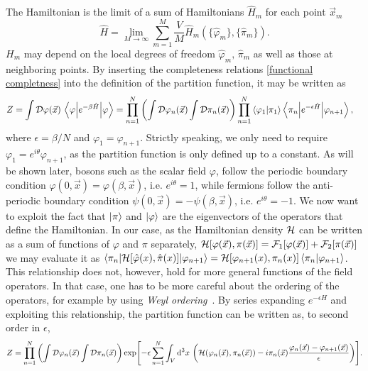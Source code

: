 The Hamiltonian is the limit of a sum of Hamiltonians $\hat H_m$ for each point $\vec x_m$
\begin{equation*}
    \hat H
    = \lim_{M \rightarrow \infty} \sum_{m=1}^M 
    \frac{V}{M} \hat H_m(\{\hat \varphi_m\}, \{\hat \pi_m\}).
\end{equation*}
$H_m$ may depend on the local degrees of freedom $\hat \varphi_m, \, \hat \pi_m$ as well as those at neighboring points.
By inserting the completeness relations \autoref{functional completness} into the definition of the partition function, it may be written as
\begin{align*}
    Z& 
    = \int \mathcal{D}\varphi(\vec x) \, \left\langle \varphi {\left| e^{- \beta \hat H} \right|} \varphi \right\rangle
    = 
    \prod_{n=1}^N  
    \left(
        \int \mathcal{D} \varphi_n (\vec x) \int \mathcal{D} \pi_n(\vec x)
    \right) 
    \prod_{n=1}^N  \braket{\varphi_1}{\pi_1} 
    \left\langle \pi_n {\left| e^{- \epsilon \hat H} \right|} \varphi_{n+1} \right\rangle,
\end{align*}
where $\epsilon = \beta / N$ and $\varphi_1 = \varphi_{n+1}$.
Strictly speaking, we only need to require $\varphi_1 = e^{i\theta}\varphi_{n+1}$, as the partition function is only defined up to a constant.
As will be shown later, bosons such as the scalar field $\varphi$, follow the periodic boundary condition $\varphi(0, \vec x) = \varphi(\beta, \vec x)$, i.e. $e^{i\theta} = 1$, while fermions follow the anti-periodic boundary condition $\psi(0, \vec x) = -\psi(\beta, \vec x)$, i.e. $e^{i\theta} = -1$.
We now want to exploit the fact that $\ket{\pi}$ and $\ket{\varphi}$ are the eigenvectors of the operators that define the Hamiltonian.
In our case, as the Hamiltonian density $\mathcal{H}$ can be written as a sum of functions of $\varphi$ and $\pi$ separately, $\mathcal{H}[\varphi(\vec x), \pi(\vec x)] = \mathcal{F}_1[\varphi(\vec x)] + \mathcal{F}_2[\pi(\vec x)]$ we may evaluate it as $\left\langle \pi_n {\left| \mathcal{H}[\hat \varphi(x), \hat \pi(x)] \right|} \varphi_{n+1} \right\rangle = \mathcal{H}[\varphi_{n+1}(x), \pi_n(x)] \braket{\pi_n}{\varphi_{n+1}}$.
This relationship does not, however, hold for more general functions of the field operators.
In that case, one has to be more careful about the ordering of the operators, for example by using \emph{Weyl ordering}~\cite{Peskin:IntroQFT}.
By series expanding $e^{-\epsilon \hat H}$ and exploiting this relationship, the partition function can be written as, to second order in $\epsilon$,
\begin{align*}
    Z = 
    \prod_{n=1}^N  
    \left(
        \int \mathcal{D} \varphi_n (\vec x) \int \mathcal{D} \pi_n(\vec x)
    \right)
    \exp[-\epsilon \sum_{n=1}^N \int_V \dd^3x \,
    \left(
        \mathcal{H}(\varphi_n(\vec x), \pi_n(\vec x)) - i \pi_n(\vec x) \frac{\varphi_n(\vec x) - \varphi_{n+1}(\vec x)}{\epsilon}
    \right)
    ].
\end{align*}

